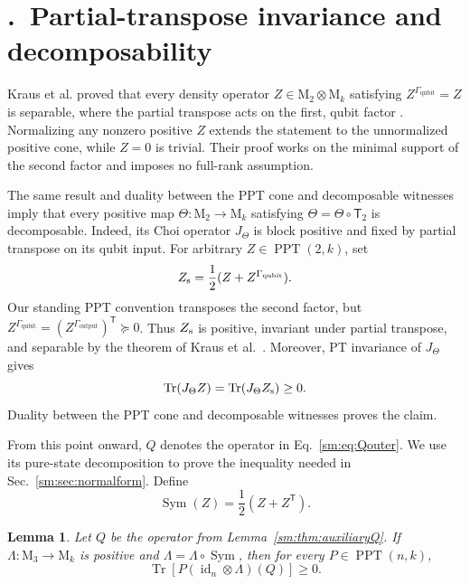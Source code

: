 \documentclass[aps,prl,reprint,superscriptaddress,nofootinbib]{revtex4-2}
\newcommand{\M}{\mathrm{M}}
\newcommand{\id}{\operatorname{id}}
\newcommand{\Tr}{\operatorname{Tr}}
\newcommand{\PPT}{\operatorname{PPT}}
\newcommand{\Sym}{\operatorname{Sym}}
\newcommand{\Tmap}{\mathsf T}
\newtheorem{lemma}[theorem]{Lemma}
\newcommand{\suppsection}[2]{%
 \refstepcounter{section}%
 \section*{\thesection.\ #1}%
 \label{sm:#2}}
\begin{document}
\suppsection{Partial-transpose invariance and decomposability}
{sec:decomposability}

Kraus et al. proved that every density operator
\(Z\in\M_2\otimes\M_k\) satisfying
\(Z^{\Gamma_{\mathrm{qubit}}}=Z\) is separable, where the partial
transpose acts on the first, qubit factor
\cite[Theorem~2]{Kraus2000}.  Normalizing any nonzero positive \(Z\)
extends the statement to the unnormalized positive cone, while \(Z=0\) is
trivial.  Their proof works on the minimal support of the second factor and imposes
no full-rank assumption.

The same result and duality between the PPT cone and decomposable witnesses
imply that every
positive map \(\Theta:\M_2\to\M_k\) satisfying
\(\Theta=\Theta\circ\Tmap_2\) is decomposable.  Indeed, its Choi
operator \(J_\Theta\) is block positive and fixed by partial
transpose on its qubit input.  For arbitrary \(Z\in\PPT(2,k)\), set
\begin{equation}
 Z_{\rm s}=\frac12(Z+Z^{\Gamma_{\mathrm{qubit}}}).
\label{sm:eq:Zsym}
\end{equation}
Our standing PPT convention transposes the second factor, but
\(Z^{\Gamma_{\mathrm{qubit}}}
=(Z^{\Gamma_{\mathrm{output}}})^{\mathsf T}\succeq0\).
Thus \(Z_{\rm s}\) is positive, invariant under partial transpose, and separable by
the theorem of Kraus et al.~\cite{Kraus2000}.
Moreover, PT invariance of \(J_\Theta\) gives
\begin{equation}
 \Tr(J_\Theta Z)=\Tr(J_\Theta Z_{\rm s})\geq0.
\label{sm:eq:decompduality}
\end{equation}
Duality between the PPT cone and decomposable witnesses proves the
claim.

From this point onward, \(Q\) denotes the operator in
Eq.~\eqref{sm:eq:Qouter}.  We use its pure-state decomposition to prove the
inequality needed in Sec.~\ref{sm:sec:normalform}.  Define
\begin{equation}
 \Sym(Z)=\frac12(Z+Z^{\mathsf T}).
\label{sm:eq:Sym}
\end{equation}

\begin{lemma}
\label{sm:prop:nonnegativepairing}
Let \(Q\) be the operator from Lemma~\ref{sm:thm:auxiliaryQ}.  If
\(\Lambda:\M_3\to\M_k\) is positive and
\(\Lambda=\Lambda\circ\Sym\), then for every
\(P\in\PPT(n,k)\),
\begin{equation}
 \Tr\!\left[P(\id_n\otimes\Lambda)(Q)\right]\geq0.
\label{sm:eq:nonnegativepairing}
\end{equation}
\end{lemma}
\end{document}
